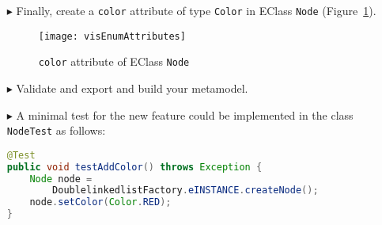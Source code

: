 \begin{itemize}
\item[$\blacktriangleright$]
Finally, create a \texttt{color} attribute of type \texttt{Color} in EClass
\texttt{Node} (Figure~\ref{enums:vis:colorAttribute}).


\begin{figure}[htbp]
    \begin{center} 
        \texttt{[image: visEnumAttributes]}
        \caption{\texttt{color} attribute of EClass \texttt{Node}}
        \label{enums:vis:colorAttribute}
    \end{center}
\end{figure}

\item[$\blacktriangleright$]
Validate and export and build your metamodel.

\item[$\blacktriangleright$]
A minimal test for the new feature could be implemented in the class
\texttt{NodeTest} as follows:
\begin{lstlisting}[language=Java,caption={Test for coloring nodes}]
@Test
public void testAddColor() throws Exception {
	Node node = 
	    DoublelinkedlistFactory.eINSTANCE.createNode();
	node.setColor(Color.RED);
}
\end{lstlisting}

\end{itemize}